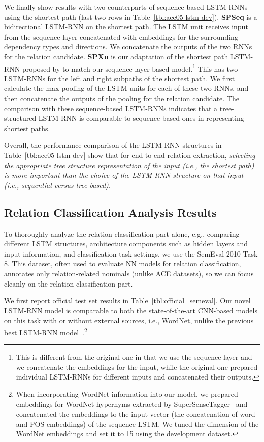 \documentclass[11pt]{article}
\begin{document}
We finally show results with two counterparts of sequence-based LSTM-RNNs using the shortest path (last two rows in Table~\ref{tbl:ace05-lstm-dev}).
{\bf SPSeq} is a bidirectional LSTM-RNN on the shortest path. The LSTM unit
receives input from the sequence layer concatenated with embeddings for the surrounding dependency types and directions. We concatenate the outputs of the two RNNs for the relation candidate. 
{\bf SPXu} is our adaptation of the shortest path LSTM-RNN proposed by  to match our sequence-layer based model.\footnote{This is different from the original one in that we use the sequence layer and we concatenate the embeddings for the input, while the original one prepared individual LSTM-RNNs for different inputs and concatenated their outputs.}
This has two LSTM-RNNs for the left and right subpaths of the shortest path. We first calculate the max pooling of the LSTM units for each of these two RNNs, and then concatenate the outputs of the pooling for the relation candidate. 
The comparison with these sequence-based LSTM-RNNs indicates that a tree-structured LSTM-RNN is comparable to sequence-based ones in representing shortest paths. 

Overall, the performance comparison of the LSTM-RNN structures in Table~\ref{tbl:ace05-lstm-dev} show that for end-to-end relation extraction, \emph{selecting the appropriate tree structure representation of the input (i.e., the shortest path) is more important than the choice of the LSTM-RNN structure on that input (i.e., sequential versus tree-based).}

\subsection{Relation Classification Analysis Results}

To thoroughly analyze the relation classification part alone, e.g., comparing different LSTM structures, architecture components such as hidden layers and input information, and classification task settings, we use the SemEval-2010 Task 8. This dataset, often used to evaluate NN models for relation classification, annotates only relation-related nominals (unlike ACE datasets), so we can focus cleanly on the relation classification part. 

We first report official test set results in Table~\ref{tbl:official_semeval}.
Our novel LSTM-RNN model is comparable to both the state-of-the-art CNN-based models on this task with or without external sources, i.e., WordNet, unlike the previous best LSTM-RNN model~\cite{xu-EtAl:2015:EMNLP2}.\footnote{When incorporating WordNet information into our model, we prepared embeddings for WordNet hypernyms extracted by SuperSenseTagger~\cite{ciaramita-altun:2006:EMNLP} and concatenated the embeddings to the input vector (the concatenation of word and POS embeddings) of the sequence LSTM. We tuned the dimension of the WordNet embeddings and set it to 15 using the development dataset.}
\end{document}
